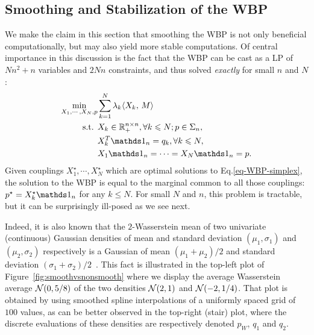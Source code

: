 
\subsection{Smoothing and Stabilization of the WBP}
\label{sec:wassbarprob}
We make the claim in this section that smoothing the WBP is not only beneficial computationally, but may also yield more stable computations. Of central importance in this discussion is the fact that the WBP can be cast as a LP of $Nn^2+n$ variables and $2Nn$ constraints, and thus solved \emph{exactly} for small $n$ and $N$:
\begin{equation}\begin{aligned}\label{eq-WBP-simplex}
	\min_{X_1,\cdots,X_N,p}& \sum_{k=1}^N \la_k  \dotp{X_k}{M}\\
	\text{s.t. } & X_k \in \RR^{n\times n}_+, \forall k\leq N; p\in\Sigma_n,\\
	& X_k^T \ones_n = \q_k, \forall k\leq N,\\
	 & X_1 \ones_n = \dots = X_N \ones_n= p.
\end{aligned}\end{equation}
Given couplings $X_1^\star,\cdots,X_N^\star$ which are optimal solutions to Eq.\eqref{eq-WBP-simplex}, the solution to the WBP is equal to the marginal common to all those couplings: $p^\star=X_k^\star \ones_n$ for any $k\leq N$. For small $N$ and $n$, this problem is tractable, but it can be surprisingly ill-posed as we see next.

Indeed, it is also known that the $2$-Wasserstein mean of two univariate (continuous) Gaussian densities of mean and standard deviation $(\mu_1,\sigma_1)$ and $(\mu_2,\sigma_2)$ respectively is a Gaussian of mean $(\mu_1+\mu_2)/2$ and standard deviation $(\sigma_1+\sigma_2)/2$~\cite[\S6.3]{Carlier_wasserstein_barycenter}. This fact is illustrated in the top-left plot of Figure~\ref{fig:smoothvsnonsmooth} where we display the average Wasserstein average $\mathcal{N}(0,5/8)$ of the two densities $\mathcal{N}(2,1)$ and $\mathcal{N}(-2,1/4)$. That plot is obtained by using smoothed spline interpolations of a uniformly spaced grid of $100$ values, as can be better observed in the top-right (stair) plot, where the discrete evaluations of these densities are respectively denoted $p_W$, $q_1$ and $q_2$.

